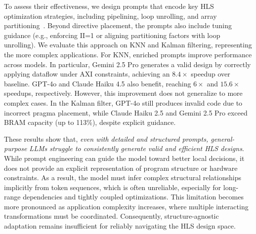 To assess their effectiveness, we design prompts that encode key HLS optimization strategies, including pipelining, loop unrolling, and array partitioning~\cite{ferretti2020leveraging}. Beyond directive placement, the prompts also include tuning guidance (e.g., enforcing II=1 or aligning partitioning factors with loop unrolling). We evaluate this approach on KNN and Kalman filtering, representing the more complex applications.
For KNN, enriched prompts improve performance across models. In particular, Gemini 2.5 Pro generates a valid design by correctly applying dataflow under AXI constraints, achieving an $8.4\times$ speedup over baseline. 
GPT-4o and Claude Haiku 4.5 also benefit, reaching $6\times$ and $15.6\times$ speedups, respectively.
However, this improvement does not generalize to more complex cases. In the Kalman filter, GPT-4o still produces invalid code due to incorrect pragma placement, while Claude Haiku 2.5 and Gemini 2.5 Pro exceed BRAM capacity (up to 113\%), despite explicit guidance.

These results show that, \textit{even with detailed and structured prompts, general-purpose LLMs struggle to consistently generate valid and efficient HLS designs}. While prompt engineering can guide the model toward better local decisions, it does not provide an explicit representation of program structure or hardware constraints. As a result, the model must infer complex structural relationships implicitly from token sequences, which is often unreliable, especially for long-range dependencies and tightly coupled optimizations. This limitation becomes more pronounced as application complexity increases, where multiple interacting transformations must be coordinated. Consequently, structure-agnostic adaptation remains insufficient for reliably navigating the HLS design space.

